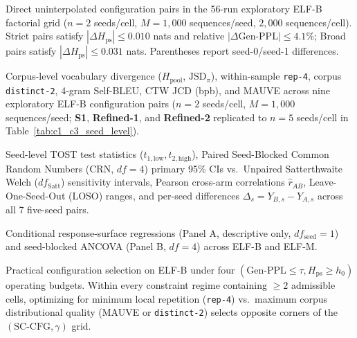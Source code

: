 \documentclass[11pt,a4paper]{article}
\begin{document}
\begin{table}[t]
    \centering
    \caption{Direct uninterpolated configuration pairs in the 56-run exploratory ELF-B factorial grid ($n=2$ seeds/cell, $M=1{,}000$ sequences/seed, $2{,}000$ sequences/cell). Strict pairs satisfy $|\Delta H_{\mathrm{ps}}| \le 0.010$ nats and relative $|\Delta\text{Gen-PPL}| \le 4.1\%$; Broad pairs satisfy $|\Delta H_{\mathrm{ps}}| \le 0.031$ nats. Parentheses report seed-0/seed-1 differences.}
    \label{tab:direct_pairs}
    \resizebox{0.84\textwidth}{!}{}
\end{table}

\begin{table}[t]
    \centering
    \caption{Corpus-level vocabulary divergence ($H_{\mathrm{pool}}$, $\mathrm{JSD}_{\pi}$), within-sample \texttt{rep-4}, corpus \texttt{distinct-2}, 4-gram Self-BLEU, CTW JCD (bpb), and MAUVE across nine exploratory ELF-B configuration pairs ($n=2$ seeds/cell, $M=1{,}000$ sequences/seed; \textbf{S1}, \textbf{Refined-1}, and \textbf{Refined-2} replicated to $n=5$ seeds/cell in Table~\ref{tab:c1_c3_seed_level}).}
    \label{tab:jcd_selfbleu_pairs}
    \resizebox{0.84\textwidth}{!}{}
\end{table}

\begin{table}[t]
    \centering
    \caption{Seed-level TOST test statistics ($t_{1,\mathrm{low}}, t_{2,\mathrm{high}}$), Paired Seed-Blocked Common Random Numbers (CRN, $df=4$) primary 95\% CIs vs.\ Unpaired Satterthwaite Welch ($df_{\mathrm{Satt}}$) sensitivity intervals, Pearson cross-arm correlations $\hat{r}_{AB}$, Leave-One-Seed-Out (LOSO) ranges, and per-seed differences $\Delta_s = Y_{B,s} - Y_{A,s}$ across all 7 five-seed pairs.}
    \label{tab:c1_c3_seed_level}
    
\end{table}

\begin{table}[t]
    \centering
    \caption{Conditional response-surface regressions (Panel A, descriptive only, $df_{\mathrm{seed}}=1$) and seed-blocked ANCOVA (Panel B, $df=4$) across ELF-B and ELF-M.}
    \label{tab:ancova}
    \resizebox{\textwidth}{!}{}
\end{table}

\begin{table}[t]
    \centering
    \caption{Practical configuration selection on ELF-B under four $(\text{Gen-PPL} \le \tau, H_{\mathrm{ps}} \ge h_0)$ operating budgets. Within every constraint regime containing $\ge 2$ admissible cells, optimizing for minimum local repetition (\texttt{rep-4}) vs.\ maximum corpus distributional quality (MAUVE or \texttt{distinct-2}) selects opposite corners of the $(\text{SC-CFG}, \gamma)$ grid.}
    \label{tab:decisions}
    \resizebox{0.88\textwidth}{!}{}
\end{table}
\end{document}
